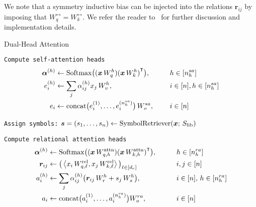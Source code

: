 We note that a symmetry inductive bias can be injected into the relations $\bm{r}_{ij}$ by imposing that $W_{q}^{\rel} = W_k^{\rel}$. We refer the reader to~ for further discussion and implementation details.


\begin{algorithm}[ht!]
	\caption{Dual-Head Attention}\label{alg:dual_head_attn}

    \vspace{1em}

    \texttt{Compute self-attention heads}
    \begin{align*}
        \bm{\alpha}^{(h)} &\gets \mathrm{Softmax}\big({(\bm{x} \, W_q^h)} {(\bm{x} \, W_k^h)}^\intercal\big), \qquad && h \in [n_h^{sa}] \\
        e_i^{(h)} &\gets \sum_{j} \alpha_{ij}^{(h)} x_j \, W_v^h, \qquad && i \in [n], h \in [n_h^{sa}]\\
        e_i &\gets \mathrm{concat}\big(e_i^{(1)}, \ldots, e_i^{(n_h^{sa})}\big) \, W_o^{sa}, && i \in [n]
    \end{align*}

    \texttt{Assign symbols:} $\bm{s} = (s_1, \ldots, s_n) \gets \mathrm{SymbolRetriever}(\bm{x};\,S_\mathrm{lib})$

    \texttt{Compute relational attention heads}
    \begin{align*}
        \bm{\alpha}^{(h)} &\gets \mathrm{Softmax}\big({(\bm{x} \, W_{q, h}^{\mathrm{attn}})} {(\bm{x} \, W_{k, h}^{\mathrm{attn}})}^\intercal\big), \qquad && h \in [n_h^{ra}] \\
        \bm{r}_{ij} &\gets \big(\left \langle x_i \, W_{q, \ell}^{\mathrm{rel}}, x_j \, W_{k, \ell}^{\mathrm{rel}} \right\rangle\big)_{\ell \in [d_r]} \qquad && i,j \in [n] \\
        a_i^{(h)} &\gets \sum_{j} \alpha_{ij}^{(h)} \big(\bm{r}_{ij}\,W_r^h + s_j \, W_s^{h}\big), \qquad && i \in [n],\, h \in [n_h^{ra}]\\
        a_i &\gets \mathrm{concat}\big(a_i^{(1)}, \ldots, a_i^{(n_h^{ra})}\big) W_o^{ra}, && i \in [n]
    \end{align*}


\end{algorithm}

